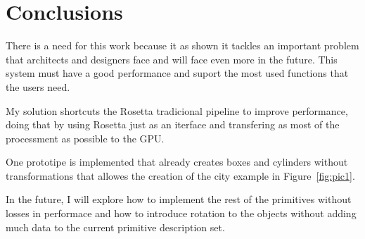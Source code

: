 
% 
% 

\section{Conclusions}
\label{sec:conclusions}

There is a need for this work because it as shown it tackles an important problem that architects and designers face and will face even more in the future. This system must have a good performance and suport the most used functions that the users need.

My solution shortcuts the Rosetta tradicional pipeline to improve performance, doing that by using Rosetta just as an iterface and transfering as most of the processment as possible to the GPU.

One prototipe is implemented that already creates boxes and cylinders without transformations that allowes the creation of the city example in Figure~\ref{fig:pic1}.

In the future, I will explore how to implement the rest of the primitives without losses in performace and how to introduce rotation to the objects without adding much data to the current primitive description set.